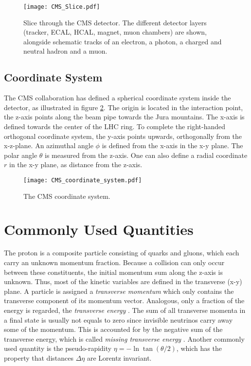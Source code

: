 \begin{figure}[htbp]
	\centering
	\texttt{[image: CMS\_Slice.pdf]}
	\caption{Slice through the CMS detector. The different detector layers (tracker, ECAL, HCAL, magnet, muon chambers) are shown, alongside schematic tracks of an electron, a photon, a charged and neutral hadron and a muon.\cite[modified]{Barney2011CMS}}
	\label{fig:cms_slice}
\end{figure}

\subsection{Coordinate System}
The CMS collaboration has defined a spherical coordinate system inside the detector, as illustrated in figure \ref{fig:cms_coordinate_system}. The origin is located in the interaction point, the z-axis points along the beam pipe towards the Jura mountains. The x-axis is defined towards the center of the LHC ring. To complete the right-handed orthogonal coordinate system, the y-axis points upwards, orthogonally from the x-z-plane. 
An azimuthal angle $\phi$ is defined from the x-axis in the x-y plane. The polar angle $\theta$ is measured from the z-axis. One can also define a radial coordinate $r$ in the x-y plane, as distance from the z-axis.\cite[p. 2]{Co2008CMS} 
\begin{figure}[htbp]
	\centering
	\texttt{[image: CMS\_coordinate\_system.pdf]}
	\caption{The CMS coordinate system.}
	\label{fig:cms_coordinate_system}
\end{figure}

\section{Commonly Used Quantities}
The proton is a composite particle consisting of quarks and gluons, which each carry an unknown momentum fraction. Because a collision can only occur between these constituents, the initial momentum sum along the z-axis is unknown.
Thus, most of the kinetic variables are defined in the transverse (x-y) plane. A particle is assigned a \emph{transverse momentum} \pT which only contains the transverse component of its momentum vector. Analogous, only a fraction of the energy is regarded, the \emph{transverse energy} \ET. 
The sum of all transverse momenta in a final state is usually not equals to zero since invisible neutrinos carry away some of the momentum. This is accounted for by the negative sum of the transverse energy, which is called \emph{missing transverse energy} \MET.
Another commonly used quantity is the pseudo-rapidity $\eta = -\ln \tan(\theta/2)$, which has the property that distances $\Delta\eta$ are Lorentz invariant.

